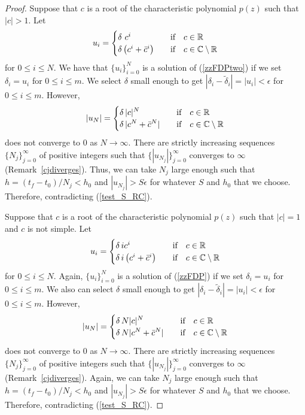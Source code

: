 \begin{proof}
Suppose that $c$ is a root of the characteristic polynomial $p(z)$
such that $|c|>1$.  Let
\[
u_i = \begin{cases}
\delta\ c^i & \quad \text{if} \quad c \in \mathbb{R} \\
\delta \left( c^i + \bar{c}^i \right) & \quad \text{if} \quad
c \in \mathbb{C} \setminus \mathbb{R}
\end{cases}
\]
for $0 \leq i \leq N$.  We have that $\{u_i\}_{i=0}^N$ is a solution of
(\ref{zzFDPtwo}) if we set $\delta_i = u_i$ for $0\leq i \leq m$.
We select $\delta$ small enough to get
$|\delta_i - \tilde{\delta}_i| = |u_i| < \epsilon$ for $0\leq i \leq m$.
However,
\[
|u_N| =
\begin{cases}
\displaystyle \delta\,|c|^N  & \quad \text{if}\quad c \in \mathbb{R} \\
\displaystyle \delta\,|c^N + \bar{c}^N| &
\quad \text{if}\quad c \in \mathbb{C}\setminus \mathbb{R}
\end{cases}
\]
does not converge to $0$ as $N \to \infty$.  There are strictly
increasing sequences $\{N_j\}_{j=0}^\infty$ of positive integers
such that $\{|u_{N_j}|\}_{j=0}^\infty$ converges to  $\infty$
(Remark~\ref{cjdiverges}).
Thus, we can take $N_j$ large enough such that 
$h = (t_f-t_0)/N_j < h_0$ and $|u_{N_j}| > S\epsilon$ for whatever $S$
and $h_0$ that we choose.  Therefore,
contradicting (\ref{test_S_RC}).

Suppose that $c$ is a root of the characteristic polynomial $p(z)$
such that $|c|=1$ and $c$ is not simple.  Let
\[
u_i = \begin{cases}
\delta\,i c^i & \quad \text{if} \quad c \in \mathbb{R} \\
\delta\, i \left( c^i + \bar{c}^i \right) & \quad \text{if}\quad  c \in \mathbb{C}
\setminus \mathbb{R}
\end{cases}
\]
for $0 \leq i \leq N$.
Again, $\{u_i\}_{i=0}^N$ is a solution of (\ref{zzFDP}) if we set
$\delta_i = u_i$ for $0\leq i \leq m$.  We also can select $\delta$
small enough to get
$|\delta_i - \tilde{\delta}_i| = |u_i| < \epsilon$ for $0\leq i \leq m$.
However,
\[
|u_N| =
\begin{cases}
\displaystyle
\delta\,N |c|^N & \quad \text{if}\quad c \in \mathbb{R} \\
\displaystyle \delta\,N |c^N + \bar{c}^N| &
\quad \text{if}\quad c \in \mathbb{C} \setminus \mathbb{R}
\end{cases}
\]
does not converge to $0$ as $N \to \infty$.   There are strictly
increasing sequences $\{N_j\}_{j=0}^\infty$ of positive integers
such that $\{|u_{N_j}|\}_{j=0}^\infty$ converges to  $\infty$
(Remark~\ref{cjdiverges}).
Again, we can take $N_j$ large enough such that
$h = (t_f-t_0)/N_j < h_0$ and $|u_{N_j}| > S\epsilon$ for whatever $S$
and $h_0$ that we choose.  Therefore, contradicting (\ref{test_S_RC}).
\end{proof}

